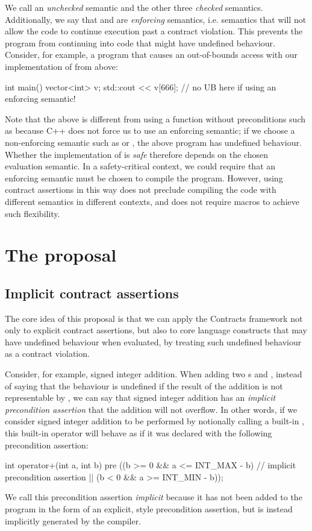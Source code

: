 We call  an \emph{unchecked} semantic and the other three \emph{checked} semantics. Additionally, we say that \mbox{} and  are \emph{enforcing} semantics, i.e. semantics that will not allow the code to continue execution past a contract violation. This prevents the program from continuing into code that might have undefined behaviour. Consider, for example, a program that causes an out-of-bounds access with our implementation of  from above:
\begin{codeblock}
int main() {
  vector<int> v;
  std::cout << v[666];    // no UB here if using an enforcing semantic!
}
\end{codeblock}
Note that the above is different from using a function without preconditions such as \mbox{} because C++ does not force us to use an enforcing semantic; if we choose a non-enforcing semantic such as  or , the above program  has undefined behaviour. Whether the implementation of   is \emph{safe} therefore depends on the chosen evaluation semantic. In a safety-critical context, we could require that an enforcing semantic must be chosen to compile the program. However, using contract assertions in this way does not preclude compiling the code with different semantics in different contexts, and does not require macros to achieve such flexibility.

\section{The proposal}

\subsection{Implicit contract assertions}

The core idea of this proposal is that we can apply the Contracts framework not only to explicit contract assertions, but also to core language constructs that may have undefined behaviour when evaluated, by treating such undefined behaviour as a contract violation.

Consider, for example, signed integer addition. When adding two s  and , instead of saying that the behaviour is undefined if the result of the addition is not representable by , we can say that signed integer addition has an \emph{implicit precondition assertion} that the addition will not overflow. In other words, if we consider signed integer addition to be performed by notionally calling a built-in , this built-in operator will behave as if it was declared with the following precondition assertion:
\begin{codeblock}
int operator+(int a, int b)
pre ((b >= 0 && a <= INT_MAX - b)  // implicit precondition assertion
  || (b < 0  && a >= INT_MIN - b));  
\end{codeblock}
We call this precondition assertion \emph{implicit} because it has not been added to the program in the form of an explicit, \cite{P2900R6} style precondition assertion, but is instead implicitly generated by the compiler.

